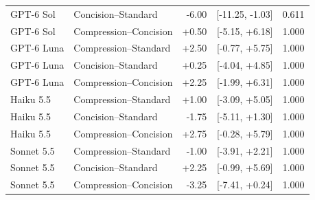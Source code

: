 \documentclass[11pt]{article}
\begin{document}
\begin{longtable}{llrrr}
GPT-6 Sol & Concision--Standard & -6.00 & [-11.25, -1.03] & 0.611 \\
GPT-6 Sol & Compression--Concision & +0.50 & [-5.15, +6.18] & 1.000 \\
GPT-6 Luna & Compression--Standard & +2.50 & [-0.77, +5.75] & 1.000 \\
GPT-6 Luna & Concision--Standard & +0.25 & [-4.04, +4.85] & 1.000 \\
GPT-6 Luna & Compression--Concision & +2.25 & [-1.99, +6.31] & 1.000 \\
Haiku 5.5 & Compression--Standard & +1.00 & [-3.09, +5.05] & 1.000 \\
Haiku 5.5 & Concision--Standard & -1.75 & [-5.11, +1.30] & 1.000 \\
Haiku 5.5 & Compression--Concision & +2.75 & [-0.28, +5.79] & 1.000 \\
Sonnet 5.5 & Compression--Standard & -1.00 & [-3.91, +2.21] & 1.000 \\
Sonnet 5.5 & Concision--Standard & +2.25 & [-0.99, +5.69] & 1.000 \\
Sonnet 5.5 & Compression--Concision & -3.25 & [-7.41, +0.24] & 1.000 \\
\bottomrule\end{longtable}
\end{document}
